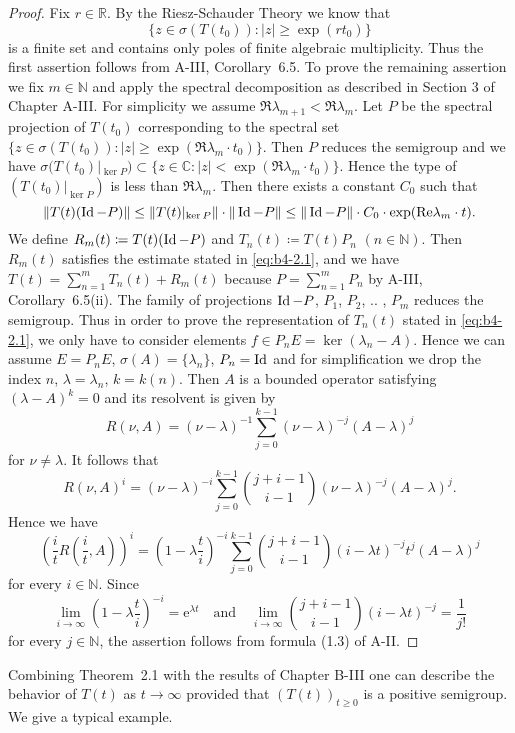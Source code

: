 \begin{proof}
	Fix $r \in \mathbb{R}$.
	By the Riesz-Schauder Theory we know that
	\[
    \{z \in \sigma(T(t_{0})) \colon |z| \geq \exp(rt_{0})\}
    \]
    is a finite set and contains only
	poles of finite algebraic multiplicity.
	Thus the first assertion
	follows from A-III, Corollary~6.5.
	To prove the remaining assertion we fix $m \in \mathbb{N}$ and apply the spectral
	decomposition as described in Section 3 of Chapter A-III.
	For simplicity we assume $\Re \lambda_{m+1} < \Re   \lambda_m$.
	Let $P$ be the spectral projection
	of $T(t_{0})$ corresponding to the spectral set $\{z \in \sigma(T(t_{0})) :
	|z| \geq \exp(\Re \lambda_m \cdot t_{0})\}$.
	Then $P$ reduces the semigroup and we have
	$\sigma(T(t_{0})|_{\ker P}) \subset \{z \in \mathbb{C} \colon |z| < \exp(\Re \lambda_m \cdot t_{0})\}$.
	Hence the type of
	$(T(t_{0})|_{\ker P})$ is less than $\Re \lambda_m$.
	Then there exists a constant $C_{0}$
	such that
\[
\|T(t)(\operatorname{Id} -P)\| \leq \|T(t)|_{\ker P}\|\cdot\|\operatorname{Id} -P\| \leq \|\operatorname{Id} -P\|\cdot C_{0} \cdot \exp(\mathop{}\!\mathrm{Re} \lambda_m \cdot t) .
\]
We define $R_m(t)  \coloneq  T(t)(\operatorname{Id} -P)$ and $T_n(t)  \coloneq  T(t)P_n$ $(n \in \mathbb{N})$.
Then $R_m(t)$ satisfies the estimate stated in \eqref{eq:b4-2.1}, and we have $T(t) =
\sum_{n=1}^m T_n(t) + R_m(t)$ because $P = \sum_{n=1}^m P_n$ by A-III, Corollary~6.5(ii).
The family of projections $\operatorname{Id} -P$, $P_1$, $P_2$, .. , $P_m$ reduces the semigroup.
Thus in order to prove the representation of $T_n(t)$ stated in
\eqref{eq:b4-2.1}, we only have to consider elements $f \in P_n E = \ker(\lambda_n-A)$.
Hence we can assume $E = P_n E$, $\sigma(A) = \{\lambda_n\}$, $P_n = \operatorname{Id} $ and for simplification
we drop the index $n$, \ie  $\lambda = \lambda_n$, $k = k(n)$.
Then $A$ is a bounded operator satisfying $(\lambda - A)^k = 0$ and its resolvent is given by
%
\[
	R(\nu,A) = (\nu-\lambda)^{-1}\sum_{j=0}^{k-1}(\nu-\lambda)^{-j}(A-\lambda)^j
\]
%
for $\nu \neq \lambda$.
It follows that
%
\[
	 R(\nu,A)^i = (\nu-\lambda)^{-i}\sum_{j=0}^{k-1}\binom{j+i-1}{i-1}(\nu-\lambda)^{-j}(A-\lambda)^j .
\]
%
Hence we have
%
\[
	(\frac{i}{t}R(\frac{i}{t},A))^i = (1-\lambda\frac{t}{i})^{-i}\sum_{j=0}^{k-1}\binom{j+i-1}{i-1}(i-\lambda t)^{-j}t^j(A-\lambda)^j 
\]
%
for every $i \in \mathbb{N}$.
Since 
%
\[
	 \lim_{i\to\infty}(1-\lambda\frac{t}{i})^{-i} = \mathrm{e}^{\lambda t}
	 \quad \text{and} \quad \lim_{i\to\infty}\binom{j+i-1}{i-1}(i-\lambda t)^{-j} = \frac{1}{j!}
\]
%
for every $j \in \mathbb{N}$, the assertion follows from formula (1.3) of A-II.
\end{proof}
Combining Theorem~2.1 with the results of Chapter B-III one can describe
the behavior of $T(t)$ as $t \to \infty$ provided that $(T(t))_{t \geq 0}$ is a
positive semigroup.
We give a typical example.

